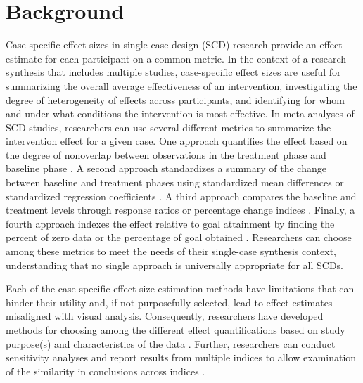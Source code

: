 \documentclass[
]{book}
\begin{document}
\hypertarget{background-3}{%
\section{Background}\label{background-3}}

Case-specific effect sizes in single-case design (SCD) research provide an effect estimate for each participant on a common metric. In the context of a research synthesis that includes multiple studies, case-specific effect sizes are useful for summarizing the overall average effectiveness of an intervention, investigating the degree of heterogeneity of effects across participants, and identifying for whom and under what conditions the intervention is most effective. In meta-analyses of SCD studies, researchers can use several different metrics to summarize the intervention effect for a given case. One approach quantifies the effect based on the degree of nonoverlap between observations in the treatment phase and baseline phase \citep{Brossart_Vannest_Davis_Patience_2014, Parker_Vannest_Davis_Sauber_2011, parker2014Nonoverlap, Parker_Vannest_2009, Scruggs_Mastropieri_Casto_1987, Tarlow_2017}. A second approach standardizes a summary of the change between baseline and treatment phases using standardized mean differences \citep{Busk_Serlin_1992, Gingerich1984meta} or standardized regression coefficients \citep{maggin2011Quantitative, van2003hierarchical}. A third approach compares the baseline and treatment levels through response ratios or percentage change indices \citep{pustejovsky2018Using}. Finally, a fourth approach indexes the effect relative to goal attainment by finding the percent of zero data \citep{Scotti_Evans_Meyer_Walker_1991} or the percentage of goal obtained \citep{Ferron_Goldstein_Olszewski_Rohrer_2020}. Researchers can choose among these metrics to meet the needs of their single-case synthesis context, understanding that no single approach is universally appropriate for all SCDs.

Each of the case-specific effect size estimation methods have limitations that can hinder their utility and, if not purposefully selected, lead to effect estimates misaligned with visual analysis. Consequently, researchers have developed methods for choosing among the different effect quantifications based on study purpose(s) and characteristics of the data \citep{Manolov_Moeyaert_Fingerhut_2022}. Further, researchers can conduct sensitivity analyses and report results from multiple indices to allow examination of the similarity in conclusions across indices \citep{Kratochwill2010single}.
\end{document}
